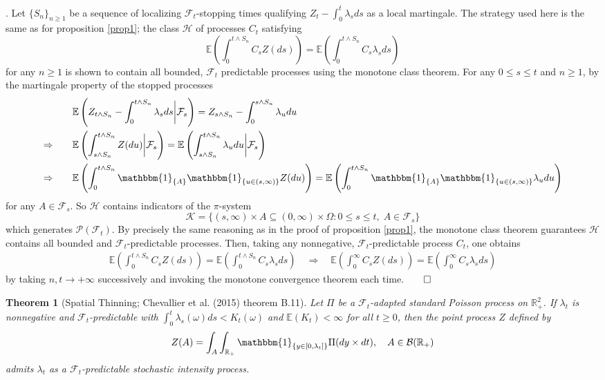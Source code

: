 \documentclass[12pt, oneside]{report}
\newcommand{\E}{\mathbb{E}}
\newcommand{\mbb}[1]{\mathbb{#1}}
\newcommand{\1}[1]{\mathbbm{1}_{\{#1\}}}
\newcommand{\mc}[1]{\mathcal{#1}}
\newtheorem{theorem}{Theorem}[section]
\theoremstyle{definition}
\begin{document}
. Let $\{S_n\}_{n\geq 1}$ be a sequence of localizing
$\mc{F}_t$-stopping times qualifying $Z_t-\int_0^t\lambda_s ds$ as a local
martingale. The strategy used here is the same as for proposition \ref{prop1};
the class $\mc{H}$ of processes $C_t$ satisfying
\[\E\left(\int_0^{t\wedge S_n}C_sZ(ds)\right)=\E\left(\int_0^{t\wedge
S_n}C_s\lambda_s ds\right)\] for any $n\geq 1$ is shown to contain all bounded,
$\mc{F}_t$ predictable processes using the monotone class theorem. For any
$0\leq s\leq t$ and $n\geq 1$, by the martingale property of the stopped
processes
\begin{align*}
    &\E\left(Z_{t\wedge S_n}-\int_0^{t\wedge S_n}\lambda_sds\bigg|\mc{F}_s\right)=Z_{s\wedge S_n}-\int_0^{s\wedge S_n}\lambda_udu\\
    \Rightarrow\qquad&\E\left(\int_{s\wedge S_n}^{t\wedge S_n}Z(du)\bigg|\mc{F}_s\right)=\E\left(\int_{s\wedge S_n}^{t\wedge S_n}\lambda_u du\bigg|\mc{F}_s\right)\\
    \Rightarrow\qquad&\E\left(\int_0^{t\wedge S_n}\1{A}\1{u\in(s,\infty)}Z(du)\right)=\E\left(\int_0^{t\wedge S_n}\1{A}\1{u\in(s,\infty)}\lambda_udu\right)
\end{align*} 
for any $A\in\mc{F}_s$. So $\mc{H}$ contains indicators of the $\pi$-system 
\[\mc{K}=\{(s,\infty)\times A\subseteq(0,\infty)\times\Omega:0\leq s\leq
t,\;A\in\mc{F}_s\}\] which generates $\mc{P}(\mc{F}_t)$. By precisely the same
reasoning as in the proof of proposition \ref{prop1}, the monotone class theorem
guarantees $\mc{H}$ contains all bounded and $\mc{F}_t$-predictable processes.
Then, taking any nonnegative, $\mc{F}_t$-predictable process $C_t$, one obtains 
\begin{align*}
    \E\left(\int_0^{t\wedge S_n}C_s Z(ds)\right)=\E\left(\int_0^{t\wedge S_n}C_s\lambda_sds\right)\quad\Rightarrow\quad\E\left(\int_0^\infty C_sZ(ds)\right)=\E\left(\int_0^\infty C_s\lambda_sds\right)
\end{align*}
by taking $n,t\rightarrow+\infty$ successively and invoking the monotone
convergence theorem each time.\hfill{$\qed$}
\begin{theorem}[Spatial Thinning; Chevallier et al.
    (2015) theorem B.11]\label{thm1} Let $\Pi$ be a $\mc{F}_t$-adapted standard Poisson
    process on $\mbb{R}_+^2$. If $\lambda_t$ is nonnegative and
    $\mc{F}_t$-predictable with $\int_0^t\lambda_s(\omega)ds<K_t(\omega)$ and $\E(K_t)<\infty$ for all $t\geq
    0$, then the
    point process $Z$ defined by
    \begin{align*}
        Z(A)=\int_A\int_{\mbb{R}_+}\1{y\in[0,\lambda_t]}\Pi(dy\times dt),\quad A\in\mc{B}(\mbb{R}_+)
    \end{align*}
    admits $\lambda_t$ as a $\mc{F}_t$-predictable stochastic intensity process.
\end{theorem}
\end{document}
